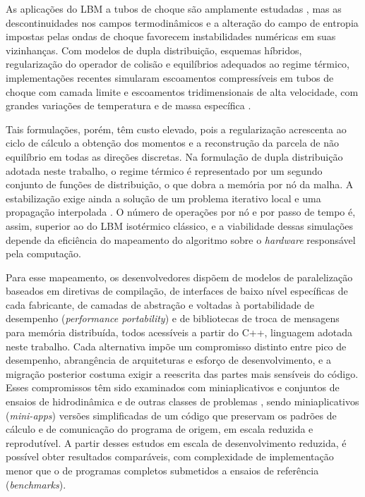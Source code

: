 As aplicações do LBM a tubos de choque são amplamente estudadas \parencite{Guo2020}, mas as descontinuidades nos campos termodinâmicos e a alteração do campo de entropia impostas pelas ondas de choque favorecem instabilidades numéricas em suas vizinhanças.
Com modelos de dupla distribuição, esquemas híbridos, regularização do operador de colisão e equilíbrios adequados ao regime térmico, implementações recentes simularam escoamentos compressíveis em tubos de choque com camada limite \parencite{Qiu2020} e escoamentos tridimensionais de alta velocidade, com grandes variações de temperatura e de massa específica \parencite{Guo2020}.

Tais formulações, porém, têm custo elevado, pois a regularização acrescenta ao ciclo de cálculo a obtenção dos momentos e a reconstrução da parcela de não equilíbrio em todas as direções discretas.
Na formulação de dupla distribuição adotada neste trabalho, o regime térmico é representado por um segundo conjunto de funções de distribuição, o que dobra a memória por nó da malha.
A estabilização exige ainda a solução de um problema iterativo local e uma propagação interpolada \parencite{Tran2022}.
O número de operações por nó e por passo de tempo é, assim, superior ao do LBM isotérmico clássico, e a viabilidade dessas simulações depende da eficiência do mapeamento do algoritmo sobre o \textit{hardware} responsável pela computação.

Para esse mapeamento, os desenvolvedores dispõem de modelos de paralelização baseados em diretivas de compilação, de interfaces de baixo nível específicas de cada fabricante, de camadas de abstração e voltadas à portabilidade de desempenho (\textit{performance portability}) e de bibliotecas de troca de mensagens para memória distribuída, todos acessíveis a partir do C++, linguagem adotada neste trabalho.
Cada alternativa impõe um compromisso distinto entre pico de desempenho, abrangência de arquiteturas e esforço de desenvolvimento, e a migração posterior costuma exigir a reescrita das partes mais sensíveis do código.
Esses compromissos têm sido examinados com miniaplicativos e conjuntos de ensaios de hidrodinâmica e de outras classes de problemas \parencite{Herdman2012, Martineau2016, Davis2023}, sendo miniaplicativos (\textit{mini-apps}) versões simplificadas de um código que preservam os padrões de cálculo e de comunicação do programa de origem, em escala reduzida e reprodutível.
A partir desses estudos em escala de desenvolvimento reduzida, é possível obter resultados comparáveis, com complexidade de implementação menor que o de programas completos submetidos a ensaios de referência (\textit{benchmarks}).

